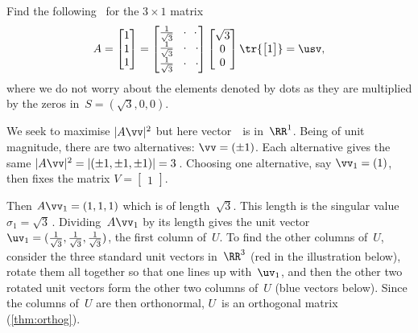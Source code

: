 \begin{example} \label{eg:3x1svd}
\def\thr{\frac1{\sqrt 3}}
Find the following \svd\ for the \(3\times1\) matrix
\begin{equation*}
A=\begin{bmatrix} 1\\1\\1 \end{bmatrix}
=\begin{bmatrix} \thr&\cdot&\cdot\;
\\\thr&\cdot&\cdot
\\\thr&\cdot&\cdot \end{bmatrix}
\begin{bmatrix} \sqrt3\\0\\0 \end{bmatrix}
\tr{\begin{bmatrix} 1 \end{bmatrix}}=\usv,
\end{equation*}
where we do not worry about the elements denoted by dots as they are multiplied by the zeros in~\(S=(\sqrt3,0,0)\).
\begin{solution} 
We seek to maximise \(|A\vv|^2\) but here vector~\vv\ is in~\(\RR^1\).  
Being of unit magnitude, there are two alternatives: \(\vv=(\pm 1)\). 
Each alternative gives the same \(|A\vv|^2=|(\pm1,\pm1,\pm1)|=3\)\,.  
Choosing one alternative, say \(\vv_1=(1)\), then fixes the matrix \(V=\begin{bmatrix} 1 \end{bmatrix}\).

Then \(A\vv_1=(1,1,1)\) which is of length~\(\sqrt3\).
This length is the singular value \(\sigma_1=\sqrt3\)\,.  
Dividing~\(A\vv_1\) by its length gives the unit vector \(\uv_1=(\thr,\thr,\thr)\), the first column of~\(U\).  
To find the other columns of~\(U\), consider the three standard unit vectors in~\(\RR^3\) (red in the illustration below), rotate them all together so that one lines up with~\(\uv_1\), and then the other two rotated unit vectors form the other two columns of~\(U\) (blue vectors below).  
Since the columns of~\(U\) are then orthonormal, \(U\)~is an orthogonal matrix (\autoref{thm:orthog}).
\end{solution}
\begin{center}
\end{center}
\end{example}
